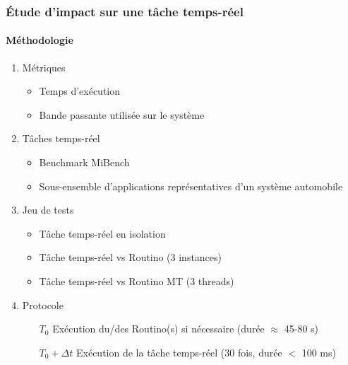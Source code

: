 
\begin{frame}
  \frametitle{\'Etude d'impact sur une tâche temps-réel}
  \framesubtitle{Méthodologie}
  \begin{enumerate}
  \item<1-> Métriques
    \begin{itemize}
    \item Temps d'exécution
    \item Bande passante utilisée sur le système
    \end{itemize}
  \item<2-> Tâches temps-réel
    \begin{itemize}
    \item Benchmark MiBench
    \item Sous-ensemble d'applications représentatives d'un système automobile
    \end{itemize}
  \item<3-> Jeu de tests
    \begin{itemize}
    \item Tâche temps-réel en isolation
    \item Tâche temps-réel vs Routino (3 instances)
    \item Tâche temps-réel vs Routino MT (3 threads)
    \end{itemize}
  \item<4> Protocole
    \begin{itemize}
    \item[$T_0$] Exécution du/des Routino(s) si nécessaire (durée $\approx$
      45-80 s)
    \item[$T_0+\Delta t$] Exécution de la tâche temps-réel (30 fois, durée $<$ 100 ms)
    \end{itemize}
  \end{enumerate}
\end{frame}


